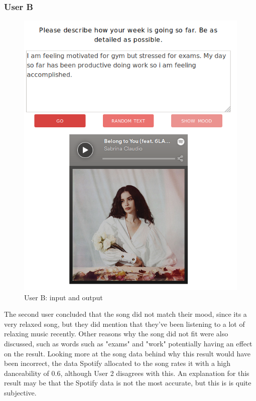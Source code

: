 \pagebreak

\subsubsection{User B}

\begin{figure}[h]
\centering
\includegraphics[scale=0.4]{implementation/jana.png}
\caption{User B: input and output}
\label{user:2}
\end{figure}

The second user concluded that the song did not match their mood, since its a very relaxed song, but they did mention that they've been listening to a lot of relaxing music recently. Other reasons why the song did not fit were also discussed, such as words such as "exams" and "work" potentially having an effect on the result. Looking more at the song data behind why this result would have been incorrect, the data Spotify allocated to the song rates it with a high danceability of 0.6, although User 2 disagrees with this. An explanation for this result may be that the Spotify data is not the most accurate, but this is is quite subjective.

